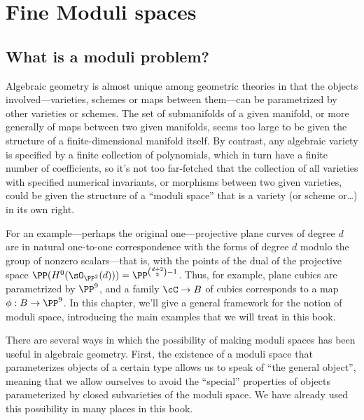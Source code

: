 

\chapter{Fine Moduli spaces} 
\label{Moduli chapter}\label{ModuliChapter}

\section{What is a moduli problem?}

Algebraic geometry is almost unique among geometric theories in that the objects involved---varieties,  schemes or maps between them---can be parametrized by other varieties or schemes. The set of submanifolds of a given manifold, or more generally of maps between two given manifolds, seems too large to be given the structure of a finite-dimensional manifold itself. By contrast, any algebraic variety is specified by a finite collection of polynomials, which in turn have a finite number of coefficients, so it's not too far-fetched that the collection of all varieties with specified numerical invariants, or morphisms between two given varieties, could be given the structure of a ``moduli space'' that is a variety (or scheme or\dots) in its own right.

For an example---perhaps the original one---projective plane curves of degree $d$
are in natural one-to-one correspondence with the forms of degree $d$ modulo the group of nonzero scalars---that is, with the points of the dual of the projective space
$ \PP(H^0(\sO_{\PP^2}(d)))=\PP^{\binom{d+2}{2}-1} $.
Thus, for example, plane cubics are parametrized by $\PP^{9}$, and a  family $\cC \to B$ of cubics corresponds to a map $\phi: B \to \PP^9$.
In this chapter, we'll give a general framework for the notion of moduli space, introducing the main examples that we will treat in this book.

 
There are several ways in which the possibility of making moduli spaces has been useful in algebraic geometry. First, the existence of a moduli space that  parameterizes objects of a certain type allows us to speak of ``the general object'', meaning that we allow ourselves to avoid the ``special'' properties of objects parameterized by closed subvarieties of the moduli space. We have already used this
possibility in many places in this book. 

